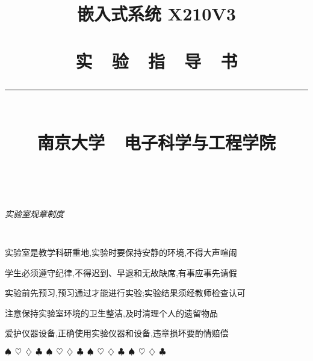 \documentclass[a4paper,11pt]{book}
\title{
\begin{flushright}
\bf 嵌入式系统 X210V3 \\ \ \\
\textsf{实~~验~~指~~导~~书}\\
\rule[10pt]{.6\textwidth}{2pt}\\
\large \textsf{南京大学~~电子科学与工程学院}
\vskip 4cm %
\end{flushright}
}
\author{}
\date{}
\renewenvironment{enumerate}
{\oldenum\setlength{\parskip}{\smallskipamount} \itemsep=-2pt}
{\oldendenum}
\begin{document}
\frontmatter
\maketitle

\thispagestyle{empty} ~ \vskip 2cm
\begin{center} \LARGE \it \textsf{实验室规章制度} \end{center}
\large \tt
\begin{enumerate}\itemsep=-5pt
  \item 实验室是教学科研重地,实验时要保持安静的环境,不得大声喧闹
  \item 学生必须遵守纪律,不得迟到、早退和无故缺席,有事应事先请假
  \item 实验前先预习,预习通过才能进行实验;实验结果须经教师检查认可
  \item 注意保持实验室环境的卫生整洁,及时清理个人的遗留物品
  \item 爱护仪器设备,正确使用实验仪器和设备,违章损坏要酌情赔偿
\end{enumerate}

\vspace{4mm}\begin{center}
$\spadesuit~~ \heartsuit~~ \diamondsuit~~ \clubsuit~~
\spadesuit~~ \heartsuit~~ \diamondsuit~~ \clubsuit~~
\spadesuit~~ \heartsuit~~ \diamondsuit~~ \clubsuit~~
\spadesuit~~ \heartsuit~~ \diamondsuit~~ \clubsuit~~$
\end{center}\vspace{4mm}



\setlength{\parindent}{2em}
\setlength\doublerulesep{.2pt}

\baselineskip=17pt
\tableofcontents

\mainmatter

\let\oldchapter\chapter
\renewcommand{\chapter}[2]
{\oldchapter{#1}
   \addthumb{#1}{\bf #2}{white}{gray}
}


\pagestyle{headings}
\setcounter{page}{1}











\end{document}

